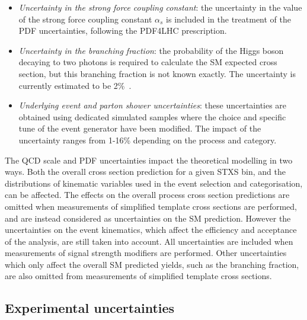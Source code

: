 \begin{itemize}
\item \textit{Uncertainty in the strong force coupling constant}: 
  the uncertainty in the value of the strong force coupling constant $\alpha_{s}$ 
  is included in the treatment of the PDF uncertainties, following the PDF4LHC prescription.
\item \textit{Uncertainty in the \Hgg branching fraction}: 
  the probability of the Higgs boson decaying to two photons is required to calculate
  the SM expected cross section, but this branching fraction is not known exactly.
  The uncertainty is currently estimated to be 2\%~\cite{YR4}.
\item \textit{Underlying event and parton shower uncertainties}: 
  these uncertainties are obtained using dedicated simulated samples 
  where the choice and specific tune of the event generator have been modified. 
  The impact of the uncertainty ranges from 1-16\% depending on the process and category.
\end{itemize}

The QCD scale and PDF uncertainties impact the theoretical modelling in two ways.
Both the overall cross section prediction for a given STXS bin, 
and the distributions of kinematic variables used in the event selection and categorisation,
can be affected.
The effects on the overall process cross section predictions are omitted 
when measurements of simplified template cross sections are performed,
and are instead considered as uncertainties on the SM prediction.
However the uncertainties on the event kinematics, 
which affect the efficiency and acceptance of the analysis, 
are still taken into account.
All uncertainties are included when measurements of signal strength modifiers are performed.
Other uncertainties which only affect the overall SM predicted yields, 
such as the \Hgg branching fraction, 
are also omitted from measurements of simplified template cross sections.

\subsection{Experimental uncertainties}

